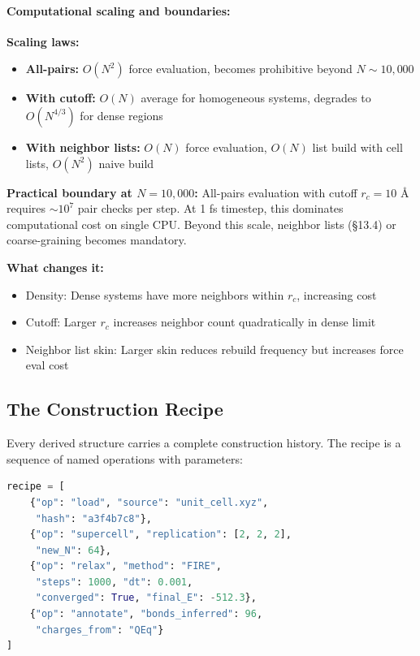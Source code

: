 \documentclass[11pt]{article}
\begin{document}
\paragraph{Computational scaling and boundaries:}

\textbf{Scaling laws:}
\begin{itemize}
\item \textbf{All-pairs:} $O(N^2)$ force evaluation, becomes prohibitive beyond $N \sim 10{,}000$
\item \textbf{With cutoff:} $O(N)$ average for homogeneous systems, degrades to $O(N^{4/3})$ for dense regions
\item \textbf{With neighbor lists:} $O(N)$ force evaluation, $O(N)$ list build with cell lists, $O(N^2)$ naive build
\end{itemize}

\textbf{Practical boundary at $N = 10{,}000$:} All-pairs evaluation with cutoff $r_c = 10$ Å requires $\sim 10^7$ pair checks per step. At 1 fs timestep, this dominates computational cost on single CPU. Beyond this scale, neighbor lists (§13.4) or coarse-graining becomes mandatory.

\textbf{What changes it:}
\begin{itemize}
\item Density: Dense systems have more neighbors within $r_c$, increasing cost
\item Cutoff: Larger $r_c$ increases neighbor count quadratically in dense limit
\item Neighbor list skin: Larger skin reduces rebuild frequency but increases force eval cost
\end{itemize}

\subsection{The Construction Recipe}

Every derived structure carries a complete construction history. The recipe is a sequence of named operations with parameters:

\begin{lstlisting}[language=Python]
recipe = [
    {"op": "load", "source": "unit_cell.xyz", 
     "hash": "a3f4b7c8"},
    {"op": "supercell", "replication": [2, 2, 2], 
     "new_N": 64},
    {"op": "relax", "method": "FIRE", 
     "steps": 1000, "dt": 0.001, 
     "converged": True, "final_E": -512.3},
    {"op": "annotate", "bonds_inferred": 96, 
     "charges_from": "QEq"}
]
\end{lstlisting}
\end{document}
